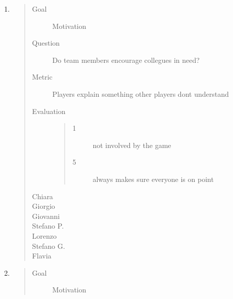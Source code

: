 \documentclass[letterpaper,10pt,italian]{sphinxmanual}
\begin{document}
\begin{enumerate}
\item {} \begin{quote}\begin{description}
\item[{Goal}] \leavevmode
\sphinxAtStartPar
Motivation

\item[{Question}] \leavevmode
\sphinxAtStartPar
Do team members encourage collegues in need?

\item[{Metric}] \leavevmode
\sphinxAtStartPar
Players explain something other players don\textquotesingle{}t understand

\item[{Evaluation}] \leavevmode\begin{quote}\begin{description}
\item[{1}] \leavevmode
\sphinxAtStartPar
not involved by the game

\item[{5}] \leavevmode
\sphinxAtStartPar
always makes sure everyone is on point

\end{description}\end{quote}

\item[{Chiara}] \leavevmode
{}

\item[{Giorgio}] \leavevmode
{}

\item[{Giovanni}] \leavevmode
{}

\item[{Stefano P.}] \leavevmode
{}

\item[{Lorenzo}] \leavevmode
{}

\item[{Stefano G.}] \leavevmode
{}

\item[{Flavia}] \leavevmode
{}

\end{description}\end{quote}

\item {} \begin{quote}\begin{description}
\item[{Goal}] \leavevmode
\sphinxAtStartPar
Motivation


\end{description}
\end{quote}
\end{enumerate}
\end{document}

